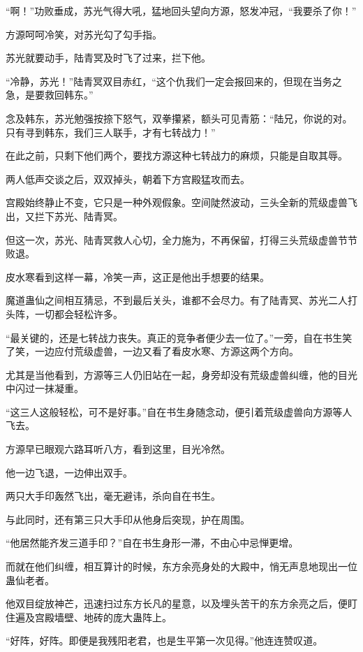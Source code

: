 \begin{this_body}
“啊！”功败垂成，苏光气得大吼，猛地回头望向方源，怒发冲冠，“我要杀了你！”

方源呵呵冷笑，对苏光勾了勾手指。

苏光就要动手，陆青冥及时飞了过来，拦下他。

“冷静，苏光！”陆青冥双目赤红，“这个仇我们一定会报回来的，但现在当务之急，是要救回韩东。”

念及韩东，苏光勉强按捺下怒气，双拳攥紧，额头可见青筋：“陆兄，你说的对。只有寻到韩东，我们三人联手，才有七转战力！”

在此之前，只剩下他们两个，要找方源这种七转战力的麻烦，只能是自取其辱。

两人低声交谈之后，双双掉头，朝着下方宫殿猛攻而去。

宫殿始终静止不变，它只是一种外观假象。空间陡然波动，三头全新的荒级虚兽飞出，又拦下苏光、陆青冥。

但这一次，苏光、陆青冥救人心切，全力施为，不再保留，打得三头荒级虚兽节节败退。

皮水寒看到这样一幕，冷笑一声，这正是他出手想要的结果。

魔道蛊仙之间相互猜忌，不到最后关头，谁都不会尽力。有了陆青冥、苏光二人打头阵，一切都会轻松许多。

“最关键的，还是七转战力丧失。真正的竞争者便少去一位了。”一旁，自在书生笑了笑，一边应付荒级虚兽，一边又看了看皮水寒、方源这两个方向。

尤其是当他看到，方源等三人仍旧站在一起，身旁却没有荒级虚兽纠缠，他的目光中闪过一抹凝重。

“这三人这般轻松，可不是好事。”自在书生身随念动，便引着荒级虚兽向方源等人飞去。

方源早已眼观六路耳听八方，看到这里，目光冷然。

他一边飞退，一边伸出双手。

两只大手印轰然飞出，毫无避讳，杀向自在书生。

与此同时，还有第三只大手印从他身后突现，护在周围。

“他居然能齐发三道手印？”自在书生身形一滞，不由心中忌惮更增。

而就在他们纠缠，相互算计的时候，东方余亮身处的大殿中，悄无声息地现出一位蛊仙老者。

他双目绽放神芒，迅速扫过东方长凡的星意，以及埋头苦干的东方余亮之后，便盯住遍及宫殿墙壁、地砖的庞大蛊阵上。

“好阵，好阵。即便是我残阳老君，也是生平第一次见得。”他连连赞叹道。

\end{this_body}

